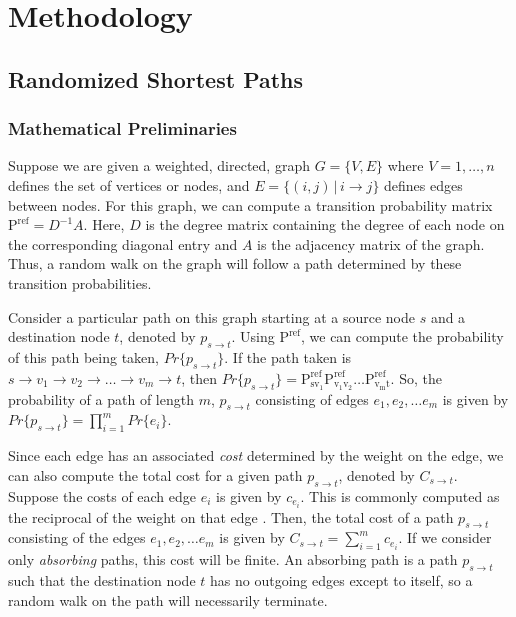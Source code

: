 \chapter{Methodology} 

\label{chapter:chapter3}

\section{Randomized Shortest Paths}

\subsection{Mathematical Preliminaries}

Suppose we are given a weighted, directed, graph $G = \{V,E\}$ where $V = 1, \ldots, n$ defines the set of vertices or nodes, and $E = \{(i,j)\,|\, i \rightarrow j \}$ defines edges between nodes. For this graph, we can compute a transition probability matrix $\mathrm{P^{ref}} = D^{-1}A$. Here, $D$ is the degree matrix containing the degree of each node on the corresponding diagonal entry and $A$ is the adjacency matrix of the graph. Thus, a random walk on the graph will follow a path determined by these transition probabilities.

Consider a particular path on this graph starting at a source node $s$ and a destination node $t$, denoted by $p_{s\rightarrow t}$. Using $\mathrm{P^{ref}}$, we can compute the probability of this path being taken, $Pr\{p_{s\rightarrow t}\}$. If the path taken is $s\rightarrow v_1 \rightarrow v_2 \rightarrow \ldots \rightarrow v_m \rightarrow t$, then  $Pr\{p_{s\rightarrow t}\} = \mathrm{P^{ref}_{sv_1}}\mathrm{P^{ref}_{v_1v_2}}\ldots\mathrm{P^{ref}_{v_mt}}$. So, the probability of a path of length $m$, $p_{s\rightarrow t}$  consisting of edges $e_1, e_2, \ldots e_m$ is given by  $Pr\{p_{s\rightarrow t}\} = \prod\limits_{i=1}^{m} Pr\{ e_i\}$.

Since each edge has an associated \emph{cost} determined by the weight on the edge, we can also compute the total cost for a given path $p_{s\rightarrow t}$, denoted by $C_{s\rightarrow t}$. Suppose the costs of each edge $e_i$ is given by $c_{e_i}$. This is commonly computed as the reciprocal of the weight on that edge \cite{Kivimaki2014}. Then, the total cost of a path $p_{s\rightarrow t}$ consisting of the edges $e_1, e_2, \ldots e_m$  is given by $C_{s\rightarrow t} = \sum\limits_{i=1}^m c_{e_i}$. If we consider only \emph{absorbing} paths, this cost will be finite. An absorbing path is a path $p_{s\rightarrow t}$ such that the destination node $t$ has no outgoing edges except to itself, so a random walk on the path will necessarily terminate.

